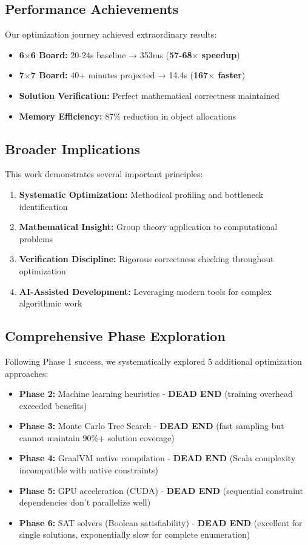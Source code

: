 \documentclass[12pt,a4paper]{article}
\theoremstyle{definition}
\begin{document}
\subsection{Performance Achievements}

Our optimization journey achieved extraordinary results:

\begin{itemize}
\item \textbf{6$\times$6 Board:} 20-24s baseline → 353ms (\textbf{57-68$\times$ speedup})
\item \textbf{7$\times$7 Board:} 40+ minutes projected → 14.4s (\textbf{167$\times$ faster})
\item \textbf{Solution Verification:} Perfect mathematical correctness maintained
\item \textbf{Memory Efficiency:} 87\% reduction in object allocations
\end{itemize}

\subsection{Broader Implications}

This work demonstrates several important principles:

\begin{enumerate}
\item \textbf{Systematic Optimization:} Methodical profiling and bottleneck identification
\item \textbf{Mathematical Insight:} Group theory application to computational problems  
\item \textbf{Verification Discipline:} Rigorous correctness checking throughout optimization
\item \textbf{AI-Assisted Development:} Leveraging modern tools for complex algorithmic work
\end{enumerate}

\subsection{Comprehensive Phase Exploration}

Following Phase 1 success, we systematically explored 5 additional optimization approaches:

\begin{itemize}
\item \textbf{Phase 2:} Machine learning heuristics - \textbf{DEAD END} (training overhead exceeded benefits)
\item \textbf{Phase 3:} Monte Carlo Tree Search - \textbf{DEAD END} (fast sampling but cannot maintain 90\%+ solution coverage)  
\item \textbf{Phase 4:} GraalVM native compilation - \textbf{DEAD END} (Scala complexity incompatible with native constraints)
\item \textbf{Phase 5:} GPU acceleration (CUDA) - \textbf{DEAD END} (sequential constraint dependencies don't parallelize well)
\item \textbf{Phase 6:} SAT solvers (Boolean satisfiability) - \textbf{DEAD END} (excellent for single solutions, exponentially slow for complete enumeration)
\end{itemize}
\end{document}
